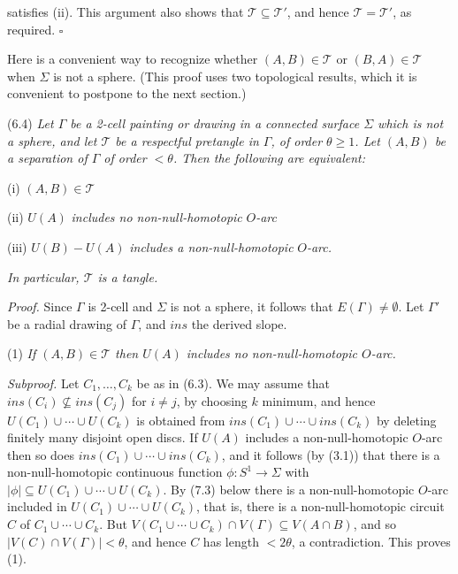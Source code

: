 \noindent satisfies (ii). This argument also shows that $\mathscr{T} \subseteq \mathscr{T}'$, and hence $\mathscr{T} = \mathscr{T}'$, as required. $\square$

Here is a convenient way to recognize whether $(A, B) \in \mathscr{T}$ or $(B, A) \in \mathscr{T}$ when $\Sigma$ is not a sphere. (This proof uses two topological results, which it is convenient to postpone to the next section.)

\stmt
(6.4) \textit{Let $\Gamma$ be a 2-cell painting or drawing in a connected surface $\Sigma$ which is not a sphere, and let $\mathscr{T}$ be a respectful pretangle in $\Gamma$, of order $\theta \ge 1$. Let $(A, B)$ be a separation of $\Gamma$ of order $< \theta$. Then the following are equivalent:}

\hspace*{12pt}(i) $(A, B) \in \mathscr{T}$

\hspace*{12pt}(ii) $U(A)$ \textit{includes no non-null-homotopic} $O$\textit{-arc}

\hspace*{12pt}(iii) $U(B) - U(A)$ \textit{includes a non-null-homotopic} $O$\textit{-arc.}

\textit{In particular, $\mathscr{T}$ is a tangle.}

\textit{Proof.} Since $\Gamma$ is 2-cell and $\Sigma$ is not a sphere, it follows that $E(\Gamma) \ne \emptyset$. Let $\Gamma'$ be a radial drawing of $\Gamma$, and $ins$ the derived slope.

\hspace*{12pt}(1) \textit{If $(A, B) \in \mathscr{T}$ then $U(A)$ includes no non-null-homotopic $O$-arc.}

\textit{Subproof.} Let $C_1, \dots, C_k$ be as in (6.3). We may assume that $ins(C_i) \not\subseteq ins(C_j)$ for $i \ne j$, by choosing $k$ minimum, and hence $U(C_1) \cup \cdots \cup U(C_k)$ is obtained from $ins(C_1) \cup \cdots \cup ins(C_k)$ by deleting finitely many disjoint open discs. If $U(A)$ includes a non-null-homotopic $O$-arc then so does $ins(C_1) \cup \cdots \cup ins(C_k)$, and it follows (by (3.1)) that there is a non-null-homotopic continuous function $\phi \colon S^1 \to \Sigma$ with $|\phi| \subseteq U(C_1) \cup \cdots \cup U(C_k)$. By (7.3) below there is a non-null-homotopic $O$-arc included in $U(C_1) \cup \cdots \cup U(C_k)$, that is, there is a non-null-homotopic circuit $C$ of $C_1 \cup \cdots \cup C_k$. But $V(C_1 \cup \cdots \cup C_k) \cap V(\Gamma) \subseteq V(A \cap B)$, and so $|V(C) \cap V(\Gamma)| < \theta$, and hence $C$ has length $< 2\theta$, a contradiction. This proves (1).

